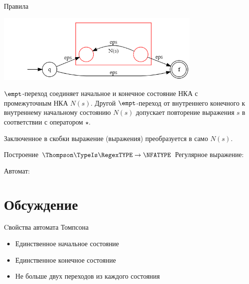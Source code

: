 \begin{frame}{Правила}
{        \includegraphics[width=4in, keepaspectratio]{tompson_rule5.png} %

        $\empt$-переход соединяет начальное и конечное состояние НКА с промежуточным НКА $N(s)$. Другой $\empt$-переход от внутреннего конечного к внутреннему начальному состоянию $N(s)$ допускает повторение выражения $s$ в соответствии с оператором $\star$.

        Заключенное в скобки выражение (выражения) преобразуется в само $N(s)$.
    }
\end{frame}%

\begin{frame}{Построение $\Thompson\TypeIs\RegexTYPE\to\NFATYPE$}
	Регулярное выражение:

	Автомат:


\end{frame}

\section{Обсуждение}
\begin{frame}{Cвойства автомата Томпсона}
    \begin{itemize}
        \item Единственное начальное состояние
        \item Единственное конечное состояние
        \item Не больше двух переходов из каждого состояния
    \end{itemize}
\end{frame}
